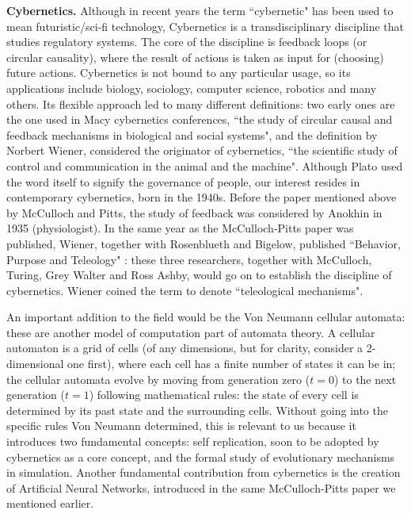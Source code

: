 \documentclass[../main.tex]{subfiles}
\begin{document}
\vspace{4pt}
\textbf{Cybernetics.}
Although in recent years the term ``cybernetic" has been used to mean futuristic/sci-fi technology, Cybernetics is a transdisciplinary discipline that studies regulatory systems. The core of the discipline is feedback loops (or circular causality), where the result of actions is taken as input for (choosing) future actions. Cybernetics is not bound to any particular usage, so its applications include biology, sociology, computer science, robotics and many others. Its flexible approach led to many different definitions: two early ones are the one used in Macy cybernetics conferences, ``the study of circular causal and feedback mechanisms in biological and social systems"\cite{steerCyberneticsCircularCausal1952}, and the definition by Norbert Wiener, considered the originator of cybernetics, ``the scientific study of control and communication in the animal and the machine"\cite{wienerCyberneticsControlCommunication1961}. Although Plato used the word itself to signify the governance of people, our interest resides in contemporary cybernetics, born in the 1940s. Before the paper mentioned above by McCulloch and Pitts, the study of feedback was considered by Anokhin in 1935 \cite{anokhinProblemsCentrePeriphery1935} (physiologist). In the same year as the McCulloch-Pitts paper was published, Wiener, together with Rosenblueth and Bigelow, published ``Behavior, Purpose and Teleology" \cite{rosenbluethBehaviorPurposeTeleology1943}: these three researchers, together with McCulloch, Turing, Grey Walter and Ross Ashby, would go on to establish the discipline of cybernetics. Wiener coined the term to denote ``teleological mechanisms".

An important addition to the field would be the Von Neumann cellular automata: these are another model of computation part of automata theory. A cellular automaton is a grid of cells (of any dimensions, but for clarity, consider a 2-dimensional one first), where each cell has a finite number of states it can be in; the cellular automata evolve by moving from generation zero ($t=0$) to the next generation ($t=1$) following mathematical rules: the state of every cell is determined by its past state and the surrounding cells. Without going into the specific rules Von Neumann determined, this is relevant to us because it introduces two fundamental concepts: self replication, soon to be adopted by cybernetics as a core concept, and the formal study of evolutionary mechanisms in simulation. Another fundamental contribution from cybernetics is the creation of Artificial Neural Networks, introduced in the same McCulloch-Pitts paper we mentioned earlier.
\end{document}
